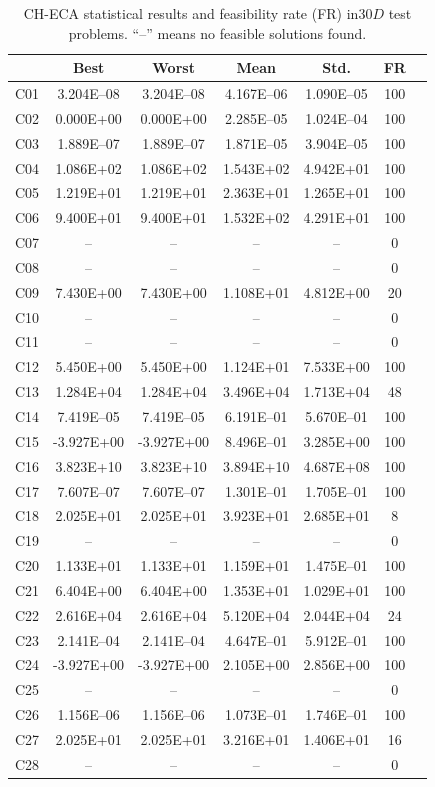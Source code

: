 \documentclass[conference]{IEEEtran}
\begin{document}
% 
% 
% 
\begin{table}[!]
	\caption{CH-ECA statistical results and feasibility rate (FR) in$30D$ test problems. ``--'' means no feasible solutions found.}
	\centering
	\begin{tabular}{|c|c|c|c|c|c|c|}
	\hline
     & Best & Worst & Mean & Std. & FR \\ \hline \hline
C01 & 3.204E--08 & 3.204E--08 & 4.167E--06 & 1.090E--05 &  100 \\ 
C02 & 0.000E+00 & 0.000E+00 & 2.285E--05 & 1.024E--04 &  100 \\ 
C03 & 1.889E--07 & 1.889E--07 & 1.871E--05 & 3.904E--05 &  100 \\ 
C04 & 1.086E+02 & 1.086E+02 & 1.543E+02 & 4.942E+01 &  100 \\ 
C05 & 1.219E+01 & 1.219E+01 & 2.363E+01 & 1.265E+01 &  100 \\ 
C06 & 9.400E+01 & 9.400E+01 & 1.532E+02 & 4.291E+01 &  100 \\ 
C07 &  -- &  -- &  -- &  -- &    0 \\ 
C08 &  -- &  -- &  -- &  -- &    0 \\ 
C09 & 7.430E+00 & 7.430E+00 & 1.108E+01 & 4.812E+00 &   20 \\ 
C10 &  -- &  -- &  -- &  -- &    0 \\ 
C11 &  -- &  -- &  -- &  -- &    0 \\ 
C12 & 5.450E+00 & 5.450E+00 & 1.124E+01 & 7.533E+00 &  100 \\ 
C13 & 1.284E+04 & 1.284E+04 & 3.496E+04 & 1.713E+04 &   48 \\ 
C14 & 7.419E--05 & 7.419E--05 & 6.191E--01 & 5.670E--01 &  100 \\ 
C15 & -3.927E+00 & -3.927E+00 & 8.496E--01 & 3.285E+00 &  100 \\ 
C16 & 3.823E+10 & 3.823E+10 & 3.894E+10 & 4.687E+08 &  100 \\ 
C17 & 7.607E--07 & 7.607E--07 & 1.301E--01 & 1.705E--01 &  100 \\ 
C18 & 2.025E+01 & 2.025E+01 & 3.923E+01 & 2.685E+01 &    8 \\ 
C19 &  -- &  -- &  -- &  -- &    0 \\ 
C20 & 1.133E+01 & 1.133E+01 & 1.159E+01 & 1.475E--01 &  100 \\ 
C21 & 6.404E+00 & 6.404E+00 & 1.353E+01 & 1.029E+01 &  100 \\ 
C22 & 2.616E+04 & 2.616E+04 & 5.120E+04 & 2.044E+04 &   24 \\ 
C23 & 2.141E--04 & 2.141E--04 & 4.647E--01 & 5.912E--01 &  100 \\ 
C24 & -3.927E+00 & -3.927E+00 & 2.105E+00 & 2.856E+00 &  100 \\ 
C25 &  -- &  -- &  -- &  -- &    0 \\ 
C26 & 1.156E--06 & 1.156E--06 & 1.073E--01 & 1.746E--01 &  100 \\ 
C27 & 2.025E+01 & 2.025E+01 & 3.216E+01 & 1.406E+01 &   16 \\ 
C28 &  -- &  -- &  -- &  -- &    0 \\ 
\hline
	\end{tabular}
	\label{tab:d30}
\end{table}
\end{document}
